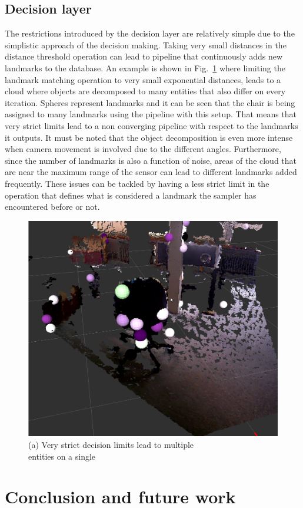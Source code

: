 \documentclass[twoside,hidelinks]{article}
\begin{document}
\subsection{Decision layer}

The restrictions introduced by the decision layer are relatively simple due to the simplistic approach of the decision making. Taking very small distances in the distance threshold operation can lead to pipeline that continuously adds new landmarks to the database. An example is shown in Fig.~\ref{pip:expo} where limiting the landmark matching operation to very small exponential distances, leads to a cloud where objects are decomposed to many entities that also differ on every iteration. Spheres represent landmarks and it can be seen that the chair is being assigned to many landmarks using the pipeline with this setup. That means that very strict limits lead to a non converging pipeline with respect to the landmarks it outputs. It must be noted that the object decomposition is even more intense when camera movement is involved due to the different angles. Furthermore, since the number of landmarks is also a function of noise, areas of the cloud that are near the maximum range of the sensor can lead to different landmarks added frequently. These issues can be tackled by having a less strict limit in the operation that defines what is considered a landmark the sampler has encountered before or not.

    \begin{figure}
        \centering
	    \includegraphics[width=.5\textwidth]{monsterchair} \\
	  (a) Very strict decision limits lead to multiple \\
	   entities on a single \\[6pt]
	  \label{pip:expo}
    \end{figure}

\newpage
\section{Conclusion and future work}
\label{sec:conclusion}
\end{document}
